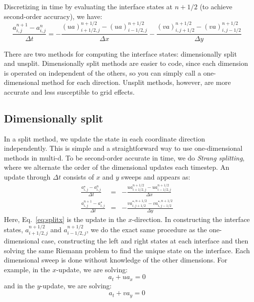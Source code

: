 Discretizing in time by evaluating the interface states at $n+1/2$ 
(to achieve second-order accuracy), we have:
\begin{equation}
 \frac{a_{i,j}^{n+1} - a_{i,j}^n}{\Delta t} =
  - \frac{ (u a)_{i+1/2,j}^{n+1/2} - (u a)_{i-1/2,j}^{n+1/2} }{\Delta x}
  - \frac{ (v a)_{i,j+1/2}^{n+1/2} - (v a)_{i,j-1/2}^{n+1/2} }{\Delta y}
\label{eq:update2du}
\end{equation}

There are two methods for computing the interface states:
dimensionally split and unsplit.  Dimensionally split methods are
easier to code, since each dimension is operated on independent of the
others, so you can simply call a one-dimensional method for each
direction.  Unsplit methods, however, are more accurate and less
susceptible to grid effects.

\subsection{Dimensionally split}

In a split method, we update the
state in each coordinate direction independently.  This is simple and
a straightforward way to use one-dimensional methods in multi-d.  To
be second-order accurate in time, we do {\em Strang splitting}, where
we alternate the order of the dimensional updates each timestep.  An update
through $\Delta t$ consists of $x$ and $y$ sweeps and appears as:
\begin{eqnarray}
 \frac{a_{i,j}^\star - a_{i,j}^n}{\Delta t} &=&
  - \frac{ u a_{i+1/2,j}^{n+1/2} - u a_{i-1/2,j}^{n+1/2} }{\Delta x} \label{eq:splitx}\\
 \frac{a_{i,j}^{n+1} - a_{i,j}^\star}{\Delta t} &=&
  - \frac{ v a_{i,j+1/2}^{\star,n+1/2} - v a_{i,j-1/2}^{\star,n+1/2} }{\Delta y} \label{eq:splity}
\end{eqnarray}
Here, Eq.~\ref{eq:splitx} is the update in the $x$-direction.  In
constructing the interface states, $a_{i+1/2,j}^{n+1/2}$ and
$a_{i-1/2,j}^{n+1/2}$, we do the exact same procedure as the
one-dimensional case, constructing the left and right states at each
interface and then solving the same Riemann problem to find the unique
state on the interface.  Each dimensional sweep is done without
knowledge of the other dimensions.  For example, in the $x$-update, we
are solving:
\begin{equation}
a_t + u a_x = 0
\label{eq:advect1dx}
\end{equation}
and in the $y$-update, we are solving:
\begin{equation}
a_t + v a_y = 0
\end{equation}

